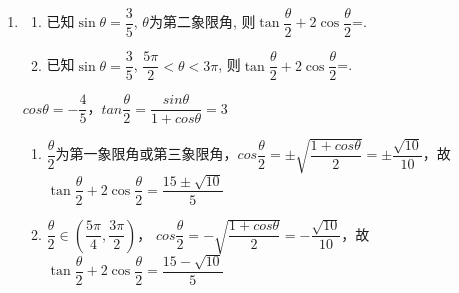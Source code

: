 \begin{enumerate}
    \begin{jieda}
        根据题目所求猜测考虑利用求$tan\dfrac{\alpha}{2}$（利用辅助角公式不是非常合适）.\\
        $2\sqrt{3}sin\dfrac{\alpha}{2}cos\dfrac{\alpha}{2} + 2\left(1 - 2sin^2\dfrac{\alpha}{2}\right) = 2$，即$2\sqrt{3}sin\dfrac{\alpha}{2}cos\dfrac{\alpha}{2} = 4sin^2\dfrac{\alpha}{2}$.变形可以得到$\dfrac{\sqrt{3}}{2} = tan\dfrac{\alpha}{2}$.\\
        因此$tan\left(\dfrac{\alpha}{2} - \dfrac{\pi}{3}\right) = \dfrac{tan\dfrac{\alpha}{2} - tan\dfrac{\pi}{3}}{1 + tan\dfrac{\alpha}{2} tan\dfrac{\pi}{3}} = -\dfrac{\sqrt{3}}{5}$
    \end{jieda}
    \item 
    \begin{enumerate}
        \item 已知$\sin\theta=\dfrac{3}{5}$, $\theta$为第二象限角, 则$\tan\dfrac{\theta}{2}+2\cos{\dfrac{\theta}{2}}$=.
        \item 已知$\sin\theta=\dfrac{3}{5}$, $\dfrac{5\pi}{2}<\theta<3\pi$, 则$\tan\dfrac{\theta}{2}+2\cos{\dfrac{\theta}{2}}$=.
    \end{enumerate}
    
    \begin{jieda}
        $cos\theta = -\dfrac{4}{5}$，$tan\dfrac{\theta}{2} = \dfrac{sin\theta}{1+cos\theta} = 3$
        \begin{enumerate}
            \item $\dfrac{\theta}{2}$为第一象限角或第三象限角，$cos\dfrac{\theta}{2} = \pm\sqrt{\dfrac{1+cos\theta}{2}} = \pm\dfrac{\sqrt{10}}{10}$，故$\tan\dfrac{\theta}{2}+2\cos{\dfrac{\theta}{2}} = \dfrac{15\pm\sqrt{10}}{5}$
            \item $\dfrac{\theta}{2} \in \left(\dfrac{5\pi}{4}, \dfrac{3\pi}{2}\right)$， $cos\dfrac{\theta}{2} = -\sqrt{\dfrac{1+cos\theta}{2}} = -\dfrac{\sqrt{10}}{10}$，故$\tan\dfrac{\theta}{2}+2\cos{\dfrac{\theta}{2}} = \dfrac{15-\sqrt{10}}{5}$
        \end{enumerate}
        

\end{jieda}
\end{enumerate}
